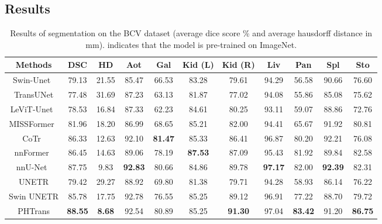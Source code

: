 \documentclass[runningheads]{llncs}
\begin{document}
\subsection{Results}
\begin{table}[tbp]
\centering
\caption{Results of segmentation on the BCV dataset (average dice score \% and average hausdorff distance in mm).   indicates that the model is pre-trained on ImageNet.}\label{tab1}
\renewcommand\arraystretch{1.2}
\scriptsize

\begin{tabular}{c|cc|cccccccc}

\hline
Methods    & DSC   & HD    & Aot & Gal    & Kid (L) & Kid (R) & Liv & Pan & Spl & Sto \\ \hline
Swin-Unet~\cite{swin-unet}  & 79.13          & 21.55         & 85.47          & 66.53          & 83.28          & 79.61          & 94.29          & 56.58          & 90.66          & 76.60          \\
TransUNet\cite{transunet}  & 77.48          & 31.69         & 87.23          & 63.13          & 81.87          & 77.02          & 94.08          & 55.86          & 85.08          & 75.62          \\
LeViT-Unet~\cite{levit}  & 78.53          & 16.84         & 87.33          & 62.23          & 84.61          & 80.25          & 93.11          & 59.07          & 88.86          & 72.76          \\
MISSFormer~\cite{missformer} & 81.96          & 18.20         & 86.99          & 68.65          & 85.21          & 82.00          & 94.41          & 65.67          & 91.92          & 80.81          \\  
CoTr~\cite{cotr}       & 86.33          & 12.63         & 92.10          & \textbf{81.47} & 85.33          & 86.41          & 96.87          & 80.20          & 92.21          & 76.08          \\
nnFormer~\cite{nnformer}    & 86.45          & 14.63         & 89.06          & 78.19          & \textbf{87.53} & 87.09          & 95.43          & 81.92          & 89.84          & 82.58          \\
nnU-Net~\cite{nnunet}    & 87.75          & 9.83          & \textbf{92.83} & 80.66          & 84.86          & 89.78          & \textbf{97.17} & 82.00          & \textbf{92.39} & 82.31          \\ 
UNETR\cite{unetr}     & 79.42          & 29.27         & 88.92          & 69.80          & 81.38          & 79.71          & 94.28          & 58.93          & 86.14          & 76.22          \\
Swin UNETR\cite{swin-unetr} & 85.78          & 17.75         & 92.78          & 76.55          & 85.25          & 89.12          & 96.91          & 77.22          & 88.70          & 79.72          
\\\hline
PHTrans    & \textbf{88.55} & \textbf{8.68} & 92.54          & 80.89          & 85.25          & \textbf{91.30} & 97.04          & \textbf{83.42} & 91.20          & \textbf{86.75} \\ \hline
\end{tabular}
\end{table}
\end{document}
